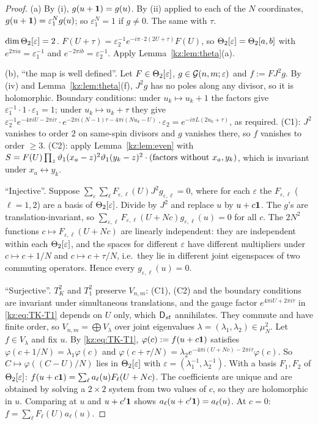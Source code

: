 \begin{proof}
(a) By (i), $g(u+\mathbf{1})=g(u)$. By (ii) applied to each of the $N$ coordinates, $g(u+\mathbf{1})=\varepsilon_1^Ng(u)$; so
$\varepsilon_1^N=1$ if $g\neq0$. The same with $\tau$.

\emph{$\dim\Theta_2[\varepsilon]=2$.} $F(U+\tau)=\varepsilon_2^{-1}e^{-i\pi\cdot2(2U+\tau)}F(U)$, so
$\Theta_2[\varepsilon]=\Theta_2[a,b]$ with $e^{2\pi ia}=\varepsilon_1^{-1}$ and $e^{-2\pi ib}=\varepsilon_2^{-1}$. Apply
Lemma~\ref{kz:lem:theta}(a).

(b), ``the map is well defined''. Let $F\in\Theta_2[\varepsilon]$, $g\in\mathcal{G}(n,m;\varepsilon)$ and $f:=FJ^2g$. By (iv)
and Lemma~\ref{kz:lem:theta}(f), $J^2g$ has no poles along any divisor, so it is holomorphic. Boundary
conditions: under $u_k\mapsto u_k+1$ the factors give $\varepsilon_1^{-1}\cdot1\cdot\varepsilon_1=1$; under
$u_k\mapsto u_k+\tau$ they give
$\varepsilon_2^{-1}e^{-4\pi iU-2\pi i\tau}\cdot e^{-2\pi i(N-1)\tau-4\pi i(Nu_k-U)}\cdot\varepsilon_2=e^{-i\pi L(2u_k+\tau)}$,
as required. (C1): $J^2$ vanishes to order $2$ on same-spin divisors and $g$ vanishes there, so $f$
vanishes to order $\ge3$. (C2): apply Lemma~\ref{kz:lem:even} with
$S=F(U)\prod_{z}\vartheta_1(x_a-z)^2\vartheta_1(y_k-z)^2\cdot(\text{factors without }x_a,y_k)$, which is invariant
under $x_a\leftrightarrow y_k$.

``Injective''. Suppose $\sum_\varepsilon\sum_\ell F_{\varepsilon,\ell}(U)J^2g_{\varepsilon,\ell}=0$, where for each $\varepsilon$ the
$F_{\varepsilon,\ell}$ ($\ell=1,2$) are a basis of $\Theta_2[\varepsilon]$. Divide by $J^2$ and replace $u$ by $u+c\mathbf{1}$. The
$g$'s are translation-invariant, so $\sum_{\varepsilon,\ell}F_{\varepsilon,\ell}(U+Nc)g_{\varepsilon,\ell}(u)=0$ for all $c$. The $2N^2$
functions $c\mapsto F_{\varepsilon,\ell}(U+Nc)$ are linearly independent: they are independent within each
$\Theta_2[\varepsilon]$, and the spaces for different $\varepsilon$ have different multipliers under $c\mapsto c+1/N$
and $c\mapsto c+\tau/N$, i.e.\ they lie in different joint eigenspaces of two commuting operators. Hence
every $g_{\varepsilon,\ell}(u)=0$.

``Surjective''. $T_K^2$ and $T_1^2$ preserve $V_{n,m}$: (C1), (C2) and the boundary conditions are
invariant under simultaneous translations, and the gauge factor $e^{4\pi iU+2\pi i\tau}$ in
\eqref{kz:eq:TK-T1} depends on $U$ only, which $\mathsf{D}_{st}$ annihilates. They commute and have finite order, so
$V_{n,m}=\bigoplus V_\lambda$ over joint eigenvalues $\lambda=(\lambda_1,\lambda_2)\in\mu_N^2$. Let $f\in V_\lambda$ and fix $u$.
By \eqref{kz:eq:TK-T1}, $\varphi(c):=f(u+c\mathbf{1})$ satisfies $\varphi(c+1/N)=\lambda_1\varphi(c)$ and
$\varphi(c+\tau/N)=\lambda_2e^{-4\pi i(U+Nc)-2\pi i\tau}\varphi(c)$. So $C\mapsto\varphi((C-U)/N)$ lies in
$\Theta_2[\varepsilon]$ with $\varepsilon=(\lambda_1^{-1},\lambda_2^{-1})$. With a basis $F_1,F_2$ of $\Theta_2[\varepsilon]$:
$f(u+c\mathbf{1})=\sum_\ell a_\ell(u)F_\ell(U+Nc)$. The coefficients are unique and are obtained by solving a
$2\times2$ system from two values of $c$, so they are holomorphic in $u$. Comparing at $u$ and $u+c'\mathbf{1}$
shows $a_\ell(u+c'\mathbf{1})=a_\ell(u)$. At $c=0$: $f=\sum_\ell F_\ell(U)a_\ell(u)$.


\end{proof}
